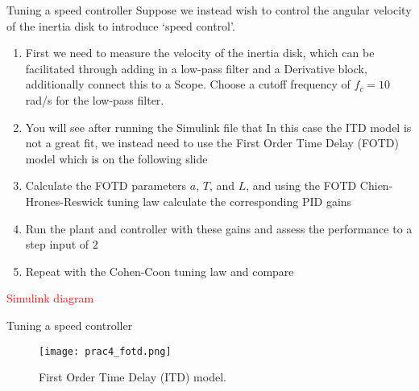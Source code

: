 \documentclass[9pt]{beamer-control}
\begin{document}
\begin{frame}{Tuning a speed controller}
Suppose we instead wish to control the angular velocity of the inertia disk to introduce `speed control'. 

\begin{enumerate}
	\item First we need to measure the velocity of the inertia disk, which can be facilitated through adding in a low-pass filter and a Derivative block, additionally connect this to a Scope. Choose a cutoff frequency of $f_c=10$ rad/s for the low-pass filter.
	\item You will see after running the Simulink file that In this case the ITD model is not a great fit, we instead need to use the First Order Time Delay (FOTD) model which is on the following slide
	\item Calculate the FOTD parameters $a$, $T$, and $L$, and using the FOTD Chien-Hrones-Reswick tuning law calculate the corresponding PID gains
	\item Run the plant and controller with these gains and assess the performance to a step input of $2$
	\item Repeat with the Cohen-Coon tuning law and compare
	
\end{enumerate}

\textcolor{red}{Simulink diagram}

\end{frame}

\begin{frame}{Tuning a speed controller}
	\begin{figure}
	\centering
	\texttt{[image: prac4\_fotd.png]}
	\caption{First Order Time Delay (ITD) model.}
\end{figure}
\end{frame}


\end{document}
